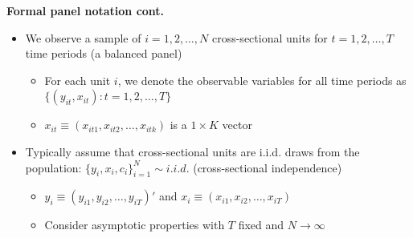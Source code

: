 \documentclass{beamer}
\begin{document}
\begin{frame}[plain]
\begin{center}
\textbf{Formal panel notation cont.}
\end{center}

\begin{itemize}
	\item We observe a sample of $i=1,2,\dots,N$ cross-sectional units for $t=1,2,\dots,T$ time periods (a balanced panel)
		\begin{itemize}
		\item For each unit $i$, we denote the observable variables for all time periods as $\{(y_{it},x_{it}):t=1,2,\dots,T\}$
		\item $x_{it}\equiv(x_{it1},x_{it2}, \dots, x_{itk})$ is a $1\times K$ vector
		\end{itemize}
	\item Typically assume that cross-sectional units are i.i.d. draws from the population: $\{y_i, x_i, c_i\}^N_{i=1}\sim i.i.d.$ (cross-sectional independence)
		\begin{itemize}
		\item $y_i \equiv (y_{i1}, y_{i2}, \dots, y_{iT})'$ and $x_i \equiv (x_{i1},x_{i2}, \dots, x_{iT})$
		\item Consider asymptotic properties with $T$ fixed and $N\rightarrow \infty$
		\end{itemize}
\end{itemize}

\end{frame}
\end{document}
